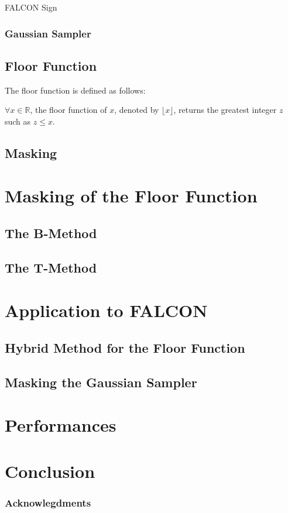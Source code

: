 \documentclass[runningheads]{llncs}
\begin{document}
\begin{algorithm}[H]
  \caption{FALCON Sign \cite{prest2020falcon}}
  \label{alg:falconsign}
\end{algorithm}

\subsubsection{Gaussian Sampler}


\subsection{Floor Function}
The floor function is defined as follows:
\begin{definition}\label{def:floorfunction}
  $\forall x \in \mathbb{R}$, the floor function of $x$, denoted by $\lfloor x \rfloor$, returns the greatest integer $z$ such as $z\leq x$.
\end{definition}
\subsection{Masking}

\section{Masking of the Floor Function}\label{sec:maskfloor}
\subsection{The B-Method}
\subsection{The T-Method}

\section{Application to FALCON}\label{sec:appfalcon}
\subsection{Hybrid Method for the Floor Function}
\subsection{Masking the Gaussian Sampler}
\section{Performances}\label{sec:perf}

\section{Conclusion}\label{sec:conclusion}
\subsubsection{Acknowlegdments}

%
%
%
 
 
\end{document}
